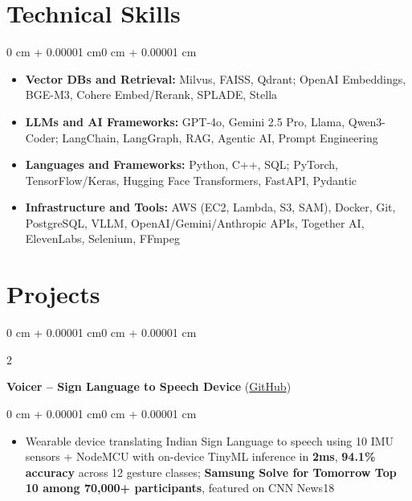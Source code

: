 \documentclass[10pt, letterpaper]{article}
\newenvironment{highlights}{
    \begin{itemize}[
        topsep=0.01 cm,
        parsep=0.01 cm,
        partopsep=0pt,
        itemsep=0pt,
        leftmargin=0 cm + 10pt
    ]
}{
    \end{itemize}
}
\newenvironment{highlightsforbulletentries}{
    \begin{itemize}[
        topsep=0.01 cm,
        parsep=0.01 cm,
        partopsep=0pt,
        itemsep=0pt,
        leftmargin=10pt
    ]
}{
    \end{itemize}
}
\newenvironment{onecolentry}{
    \begin{adjustwidth}{0 cm + 0.00001 cm}{0 cm + 0.00001 cm}
}{
    \end{adjustwidth}
}
\newenvironment{twocolentry}[2][]{
    \onecolentry
    \def\secondColumn{#2}
    \setcolumnwidth{\fill, 5.5 cm}
    \begin{paracol}{2}
}{
    \switchcolumn \raggedleft \secondColumn
    \end{paracol}
    \endonecolentry
}
\let\hrefWithoutArrow\href
\begin{document}
    \section{Technical Skills}

    \begin{onecolentry}
        \begin{highlightsforbulletentries}
            \item \textbf{Vector DBs and Retrieval:} Milvus, FAISS, Qdrant; OpenAI Embeddings, BGE-M3, Cohere Embed/Rerank, SPLADE, Stella
            \item \textbf{LLMs and AI Frameworks:} GPT-4o, Gemini 2.5 Pro, Llama, Qwen3-Coder; LangChain, LangGraph, RAG, Agentic AI, Prompt Engineering
            \item \textbf{Languages and Frameworks:} Python, C++, SQL; PyTorch, TensorFlow/Keras, Hugging Face Transformers, FastAPI, Pydantic
            \item \textbf{Infrastructure and Tools:} AWS (EC2, Lambda, S3, SAM), Docker, Git, PostgreSQL, VLLM, OpenAI/Gemini/Anthropic APIs, Together AI, ElevenLabs, Selenium, FFmpeg
        \end{highlightsforbulletentries}
    \end{onecolentry}

    \section{Projects}

        \begin{twocolentry}{
            2023
        }
            \textbf{Voicer -- Sign Language to Speech Device} (\hrefWithoutArrow{https://github.com/amit-gohel/voicer}{GitHub})
        \end{twocolentry}

        \vspace{0.02 cm}
        \begin{onecolentry}
            \begin{highlights}
                \item Wearable device translating Indian Sign Language to speech using 10 IMU sensors + NodeMCU with on-device TinyML inference in \textbf{2ms}, \textbf{94.1\% accuracy} across 12 gesture classes; \textbf{Samsung Solve for Tomorrow Top 10 among 70,000+ participants}, featured on CNN News18
            \end{highlights}
        \end{onecolentry}
\end{document}
